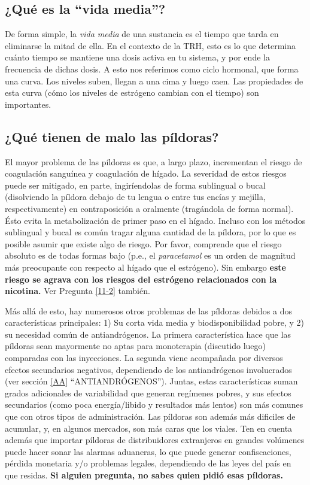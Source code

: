 \documentclass{article}
\begin{document}
\subsection{¿Qué es la “vida media”?}

De forma simple, la \textit{vida media} de una sustancia es el tiempo que tarda en eliminarse la mitad de ella. En el contexto de la TRH, esto es lo que determina cuánto tiempo se mantiene una dosis activa en tu sistema, y por ende la frecuencia de dichas dosis. A esto nos referimos como ciclo hormonal, que forma una curva. Los niveles suben, llegan a una cima y luego caen. Las propiedades de esta curva (cómo los niveles de estrógeno cambian con el tiempo) son importantes.

\subsection{¿Qué tienen de malo las píldoras?}

El mayor problema de las píldoras es que, a largo plazo, incrementan el riesgo de coagulación sanguínea y coagulación de hígado. La severidad de estos riesgos puede ser mitigado, en parte, ingiríendolas de forma sublingual o bucal (disolviendo la píldora debajo de tu lengua o entre tus encías y mejilla, respectivamente) en contraposición a oralmente (tragándola de forma normal). Ésto evita la metabolización de primer paso en el hígado. Incluso con los métodos sublingual y bucal es común tragar alguna cantidad de la píldora, por lo que es posible asumir que existe algo de riesgo.
Por favor, comprende que el riesgo absoluto es de todas formas bajo (p.e., el \textit{paracetamol} es un orden de magnitud más preocupante con respecto al hígado que el estrógeno). Sin embargo \textbf{este riesgo se agrava con los riesgos del estrógeno relacionados con la nicotina.} Ver Pregunta \ref{11-2} también.

Más allá de esto, hay numerosos otros problemas de las píldoras debidos a dos características principales: 1) Su corta vida media y biodisponibilidad pobre, y 2) su necesidad común de antiandrógenos. La primera característica hace que las píldoras sean mayormente no aptas para monoterapia (discutido luego) comparadas con las inyecciones. La segunda viene acompañada por diversos efectos secundarios negativos, dependiendo de los antiandrógenos involucrados (ver sección \ref{AA} “ANTIANDRÓGENOS”).  Juntas, estas características suman grados adicionales de variabilidad que generan regímenes pobres, y sus efectos secundarios (como poca energía/libido y resultados más lentos) son más comunes que con otros tipos de administración. Las píldoras son además más dificiles de acumular, y, en algunos mercados, son más caras que los viales. Ten en cuenta además que importar píldoras de distribuidores extranjeros en grandes volúmenes puede hacer sonar las alarmas aduaneras, lo que puede generar confiscaciones, pérdida monetaria y/o problemas legales, dependiendo de las leyes del país en que residas. \textbf{Si alguien pregunta, no sabes quien pidió esas píldoras.}
\end{document}
